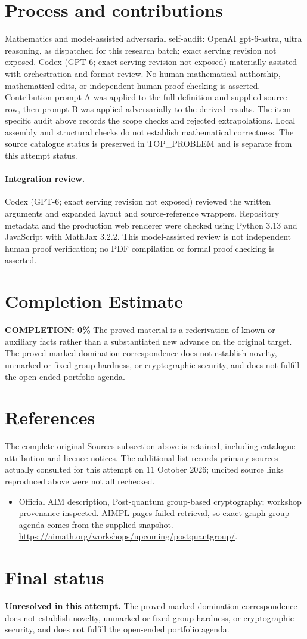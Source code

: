 \documentclass[11pt]{article}
\begin{document}
\section{Process and contributions}
Mathematics and model-assisted adversarial self-audit: OpenAI gpt-6-astra, ultra reasoning, as dispatched for this research batch; exact serving revision not exposed. Codex (GPT-6; exact serving revision not exposed) materially assisted with orchestration and format review. No human mathematical authorship, mathematical edits, or independent human proof checking is asserted.
Contribution prompt A was applied to the full definition and supplied source row, then prompt B was applied adversarially to the derived results. The item-specific audit above records the scope checks and rejected extrapolations. Local assembly and structural checks do not establish mathematical correctness. The source catalogue status is preserved in TOP\_PROBLEM and is separate from this attempt status.
\paragraph{Integration review.} Codex (GPT-6; exact serving revision not exposed) reviewed the written arguments and expanded layout and source-reference wrappers. Repository metadata and the production web renderer were checked using Python 3.13 and JavaScript with MathJax 3.2.2. This model-assisted review is not independent human proof verification; no PDF compilation or formal proof checking is asserted.

\section{Completion Estimate}
\noindent\textbf{COMPLETION: 0\%}
The proved material is a rederivation of known or auxiliary facts rather than a substantiated new advance on the original target. The proved marked domination correspondence does not establish novelty, unmarked or fixed-group hardness, or cryptographic security, and does not fulfill the open-ended portfolio agenda.
\section{References}
The complete original Sources subsection above is retained, including catalogue attribution and licence notices. The additional list records primary sources actually consulted for this attempt on 11 October 2026; uncited source links reproduced above were not all rechecked.
\begin{itemize}
\item Official AIM description, Post-quantum group-based cryptography; workshop provenance inspected. AIMPL pages failed retrieval, so exact graph-group agenda comes from the supplied snapshot. \url{https://aimath.org/workshops/upcoming/postquantgroup/}.
\end{itemize}
\section{Final status}
\textbf{Unresolved in this attempt.} The proved marked domination correspondence does not establish novelty, unmarked or fixed-group hardness, or cryptographic security, and does not fulfill the open-ended portfolio agenda.
\end{document}
